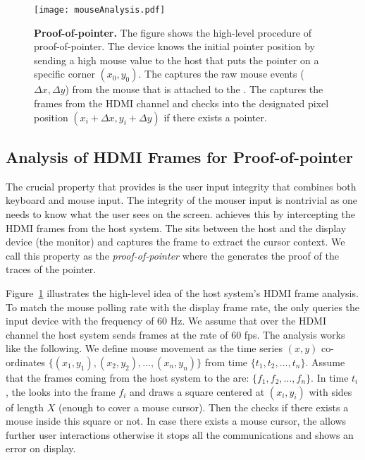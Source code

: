 \begin{figure}[t]
\centering
\texttt{[image: mouseAnalysis.pdf]}
\caption{\textbf{Proof-of-pointer.} The figure shows the high-level procedure of proof-of-pointer. The device knows the initial pointer position by sending a high mouse value to the host that puts the pointer on a specific corner $(x_0, y_0)$. \one The \device captures the raw mouse events ($\Delta x, \Delta y$) from the mouse that is attached to the \device. \two The \device captures the frames from the HDMI channel and checks into the designated pixel position $(x_i + \Delta x, y_i + \Delta y)$ if there exists a pointer.}
\label{fig:mouseAnalysis}
\centering
\end{figure}

\subsection{Analysis of HDMI Frames for Proof-of-pointer}
\label{sec:systemDesign:analysis}

The crucial property that \name provides is the user input integrity that combines both keyboard and mouse input. The integrity of the mouser input is nontrivial as one needs to know what the user sees on the screen. \name achieves this by intercepting the HDMI frames from the host system. The \device sits between the host and the display device (the monitor) and captures the frame to extract the cursor context. We call this property as the \emph{proof-of-pointer} where the \device generates the proof of the traces of the pointer. 

Figure~\ref{fig:mouseAnalysis} illustrates the high-level idea of the host system's HDMI frame analysis. To match the mouse polling rate with the display frame rate, the \device only queries the input device with the frequency of $60$ Hz. We assume that over the HDMI channel the host system sends frames at the rate of $60$ fps. The analysis works like the following. We define mouse movement as the time series $(x,y)$ co-ordinates $\{(x_1,y_1), (x_2, y_2), \ldots, (x_n,y_n)\}$ from time $\{t_1, t_2, \ldots, t_n\}$. Assume that the frames coming from the host system to the \device are: $\{f_1, f_2, \ldots, f_n\}$. In time $t_i$, the \device looks into the frame $f_i$ and draws a square centered at $(x_i, y_i)$ with sides of length $X$ (enough to cover a mouse cursor). Then the \device checks if there exists a mouse inside this square or not. In case there exists a mouse cursor, the \device allows further user interactions otherwise it stops all the communications and shows an error on display.


